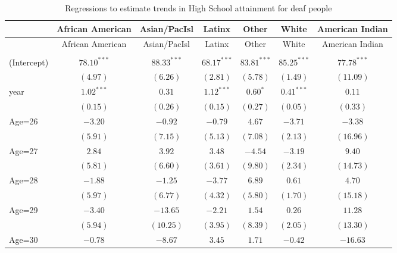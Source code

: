 \documentclass[fullpage]{paper}
\begin{document}
\begin{center}
\begin{longtable}{l c c c c c c }
\hline
 & African American & Asian/PacIsl & Latinx & Other & White & American Indian \\
\hline
\endfirsthead
\hline
 & African American & Asian/PacIsl & Latinx & Other & White & American Indian \\
\hline
\endhead
\hline
\endfoot
\hline
\multicolumn{7}{l}{\scriptsize{$^{***}p<0.001$, $^{**}p<0.01$, $^*p<0.05$}}\\
\caption{Regressions to estimate trends in High School attainment for deaf people}
\label{table:coefficients}
\endlastfoot
(Intercept) & $78.10^{***}$ & $88.33^{***}$  & $68.17^{***}$  & $83.81^{***}$ & $85.25^{***}$ & $77.78^{***}$ \\
            & $(4.97)$      & $(6.26)$       & $(2.81)$       & $(5.78)$      & $(1.49)$      & $(11.09)$     \\
year        & $1.02^{***}$  & $0.31$         & $1.12^{***}$   & $0.60^{*}$    & $0.41^{***}$  & $0.11$        \\
            & $(0.15)$      & $(0.26)$       & $(0.15)$       & $(0.27)$      & $(0.05)$      & $(0.33)$      \\
Age=26      & $-3.20$       & $-0.92$        & $-0.79$        & $4.67$        & $-3.71$       & $-3.38$       \\
            & $(5.91)$      & $(7.15)$       & $(5.13)$       & $(7.08)$      & $(2.13)$      & $(16.96)$     \\
Age=27      & $2.84$        & $3.92$         & $3.48$         & $-4.54$       & $-3.19$       & $9.40$        \\
            & $(5.81)$      & $(6.60)$       & $(3.61)$       & $(9.80)$      & $(2.34)$      & $(14.73)$     \\
Age=28      & $-1.88$       & $-1.25$        & $-3.77$        & $6.89$        & $0.61$        & $4.70$        \\
            & $(5.97)$      & $(6.77)$       & $(4.32)$       & $(5.80)$      & $(1.70)$      & $(15.18)$     \\
Age=29      & $-3.40$       & $-13.65$       & $-2.21$        & $1.54$        & $0.26$        & $11.28$       \\
            & $(5.94)$      & $(10.25)$      & $(3.95)$       & $(8.39)$      & $(2.05)$      & $(13.30)$     \\
Age=30      & $-0.78$       & $-8.67$        & $3.45$         & $1.71$        & $-0.42$       & $-16.63$      \\

\end{longtable}
\end{center}
\end{document}
